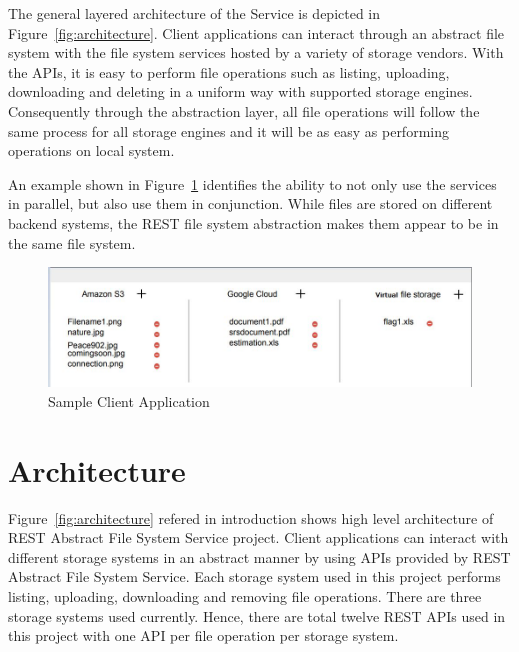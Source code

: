 The general layered architecture of the Service is depicted in
Figure~\ref{fig:architecture}. Client applications can interact
through an abstract file system with the file system services hosted
by a variety of storage vendors. With the APIs, it is easy to perform
file operations such as listing, uploading, downloading and deleting
in a uniform way with supported storage engines. Consequently through
the abstraction layer, all file operations will follow the same
process for all storage engines and it will be as easy as performing
operations on local system.

An example shown in Figure~\ref{fig:client} identifies the ability to
not only use the services in parallel, but also use them in
conjunction. While files are stored on different backend systems, the
REST file system abstraction makes them appear to be in the same file
system.

\begin{figure}[!ht]
        \centering\includegraphics[width=\columnwidth]
        {image/client.JPG}
        \caption{Sample Client Application}\label{fig:client}
\end{figure}


\section{Architecture}

Figure~\ref{fig:architecture} refered in introduction shows high 
level architecture of REST Abstract File System Service project. 
Client applications can interact with different storage systems 
in an abstract manner by using APIs provided by REST Abstract 
File System Service. Each storage system used in this project 
performs listing, uploading, downloading and removing file 
operations. There are three storage systems used currently. 
Hence, there are total twelve REST APIs used in this project 
with one API per file operation per storage system. 


